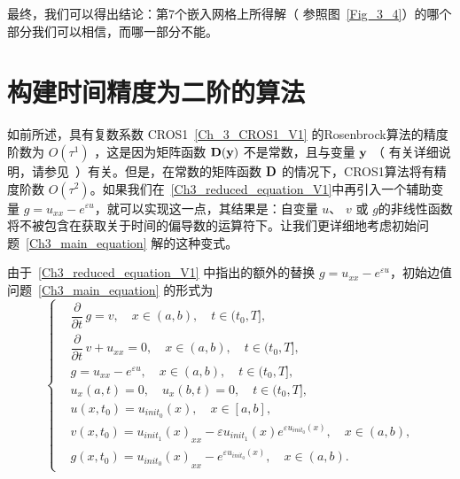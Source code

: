 \documentclass[twoside]{book}
\def\textbf{\bf}%
\begin{document}
\begin{CJK*}{GBK}{song}
最终，我们可以得出结论：第7个嵌入网格上所得解（ 参照图~\ref{Fig_3_4}）的哪个部分我们可以相信，而哪一部分不能。




\section{构建时间精度为二阶的算法}

如前所述，具有复数系数 CROS1~\eqref{Ch_3_CROS1_V1} 的Rosenbrock算法的精度阶数为 $O(\tau^1)$ ，这是因为矩阵函数 $\emph{\textbf{D}}(\emph{\textbf{y}})$ 不是常数，且与变量 $\emph{\textbf{y}}$ （ 有关详细说明，请参见~\cite{BUE_basic_1,BUE_basic_2}）有关。但是，在常数的矩阵函数 $\emph{\textbf{D}}$ 的情况下，CROS1算法将有精度阶数 $O(\tau^2)$。如果我们在~\eqref{Ch3_reduced_equation_V1}中再引入一个辅助变量 $g = u_{xx} - e^{\varepsilon u}$，就可以实现这一点，其结果是：自变量 $u$、 $v$ 或 $g$的非线性函数将不被包含在获取关于时间的偏导数的运算符下。让我们更详细地考虑初始问题~\eqref{Ch3_main_equation} 解的这种变式。

由于~\eqref{Ch3_reduced_equation_V1} 中指出的额外的替换 $g = u_{xx} - e^{\varepsilon u}$，初始边值问题~\eqref{Ch3_main_equation} 的形式为
\begin{equation}
\label{Ch3_reduced_equation_V2}
    \left\{
    \begin{aligned}
        &\dfrac{\partial}{\partial t} \, g = v, \quad x \in (a,b), \quad t \in (t_0,T], \\
        &\dfrac{\partial}{\partial t} \, v + u_{xx} = 0, \quad x \in (a,b), \quad t \in (t_0,T], \\
        &g = u_{xx} - e^{\varepsilon u}, \quad x \in (a,b), \quad t \in (t_0,T], \\
        &u_x(a,t) = 0, \quad u_x(b,t) = 0, \quad t \in (t_0,T],\\
        &u(x,t_0) = u_{init_0}(x), \quad x \in [a,b],\\
        &v(x,t_0) = {u_{init_1}(x)}_{xx} -\varepsilon u_{init_1}(x) e^{\varepsilon u_{init_0}(x)}, \quad x \in (a,b),\\
        &g(x,t_0) = {u_{init_0}(x)}_{xx} - e^{\varepsilon u_{init_0}(x)}, \quad x \in (a,b).
    \end{aligned}
    \right.
\end{equation}


\end{CJK*}
\end{document}
